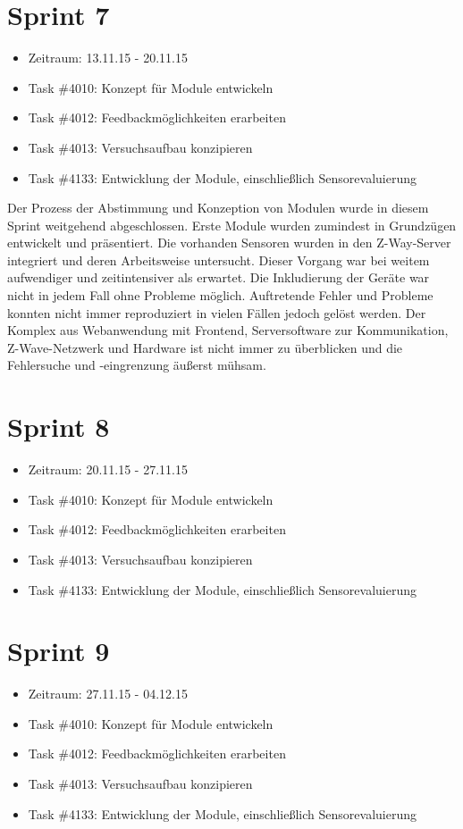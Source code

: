 \documentclass[12pt, oneside, smallheadings]{scrbook}
\begin{document}
\section{Sprint 7}
\begin{itemize}
	\item Zeitraum: 13.11.15 - 20.11.15
	\item Task \#4010: Konzept für Module entwickeln
	\item Task \#4012: Feedbackmöglichkeiten erarbeiten
	\item Task \#4013: Versuchsaufbau konzipieren
	\item Task \#4133: Entwicklung der Module, einschließlich Sensorevaluierung
\end{itemize}
Der Prozess der Abstimmung und Konzeption von Modulen wurde in diesem Sprint weitgehend abgeschlossen. Erste Module wurden zumindest in Grundzügen entwickelt und präsentiert. Die vorhanden Sensoren wurden in den Z-Way-Server integriert und deren Arbeitsweise untersucht. Dieser Vorgang war bei weitem aufwendiger und zeitintensiver als erwartet. Die Inkludierung der Geräte war nicht in jedem Fall ohne Probleme möglich. Auftretende Fehler und Probleme konnten nicht immer reproduziert in vielen Fällen jedoch gelöst werden. Der Komplex aus Webanwendung mit Frontend, Serversoftware zur Kommunikation, Z-Wave-Netzwerk und Hardware ist nicht immer zu überblicken und die Fehlersuche und -eingrenzung äußerst mühsam.

\section{Sprint 8}
\begin{itemize}
	\item Zeitraum: 20.11.15 - 27.11.15
	\item Task \#4010: Konzept für Module entwickeln
	\item Task \#4012: Feedbackmöglichkeiten erarbeiten
	\item Task \#4013: Versuchsaufbau konzipieren
	\item Task \#4133: Entwicklung der Module, einschließlich Sensorevaluierung
\end{itemize}


\section{Sprint 9}
\begin{itemize}
	\item Zeitraum: 27.11.15 - 04.12.15
	\item Task \#4010: Konzept für Module entwickeln
	\item Task \#4012: Feedbackmöglichkeiten erarbeiten
	\item Task \#4013: Versuchsaufbau konzipieren
	\item Task \#4133: Entwicklung der Module, einschließlich Sensorevaluierung
\end{itemize}
\end{document}
